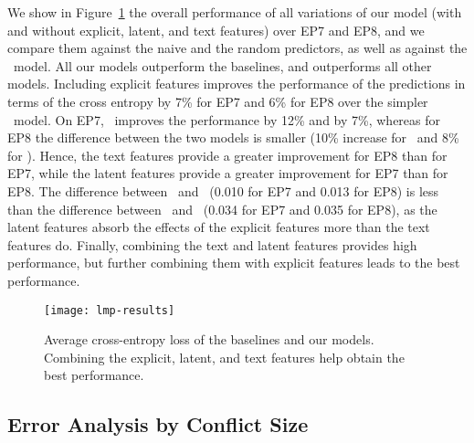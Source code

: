 We show in Figure~\ref{lmp:fig:results} the overall performance of all variations of our model (with and without explicit, latent, and text features) over EP7 and EP8, and we compare them against the naive and the random predictors, as well as against the \wow{}\ model.
All our models outperform the baselines, and  outperforms all other models.
Including explicit features improves the performance of the predictions in terms of the cross entropy by 7\% for EP7 and 6\% for EP8 over the simpler \wow{}\ model.
On EP7, \ improves the performance by 12\% and  by 7\%, whereas for EP8 the difference between the two models is smaller (10\% increase for \ and 8\% for ).
Hence, the text features provide a greater improvement for EP8 than for EP7, while the latent features provide a greater improvement for EP7 than for EP8.
The difference between \ and \ (0.010 for EP7 and 0.013 for EP8) is less than the difference between \ and \ (0.034 for EP7 and 0.035 for EP8), as the latent features absorb the effects of the explicit features more than the text features do.
Finally, combining the text and latent features provides high performance, but further combining them with explicit features leads to the best performance.

\begin{figure}
	\centering
	\texttt{[image: lmp-results]}
	\caption{%
		Average cross-entropy loss of the baselines and our models.
		Combining the explicit, latent, and text features help obtain the best performance.
	}
	\label{lmp:fig:results}
\end{figure}

\subsection{Error Analysis by Conflict Size}

